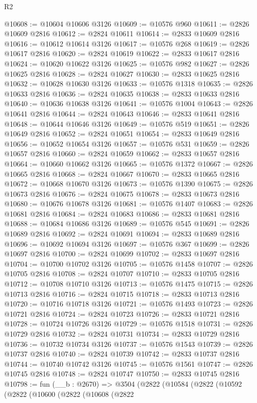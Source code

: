 \begin{lexlean}{R2}
\begin{coremodule}
@10608 := @10604 @10606 @3126
@10609 := @10576 @960
@10611 := @2826 @10609 @2816
@10612 := @2824 @10611
@10614 := @2833 @10609 @2816
@10616 := @10612 @10614 @3126
@10617 := @10576 @268
@10619 := @2826 @10617 @2816
@10620 := @2824 @10619
@10622 := @2833 @10617 @2816
@10624 := @10620 @10622 @3126
@10625 := @10576 @982
@10627 := @2826 @10625 @2816
@10628 := @2824 @10627
@10630 := @2833 @10625 @2816
@10632 := @10628 @10630 @3126
@10633 := @10576 @1318
@10635 := @2826 @10633 @2816
@10636 := @2824 @10635
@10638 := @2833 @10633 @2816
@10640 := @10636 @10638 @3126
@10641 := @10576 @1004
@10643 := @2826 @10641 @2816
@10644 := @2824 @10643
@10646 := @2833 @10641 @2816
@10648 := @10644 @10646 @3126
@10649 := @10576 @519
@10651 := @2826 @10649 @2816
@10652 := @2824 @10651
@10654 := @2833 @10649 @2816
@10656 := @10652 @10654 @3126
@10657 := @10576 @531
@10659 := @2826 @10657 @2816
@10660 := @2824 @10659
@10662 := @2833 @10657 @2816
@10664 := @10660 @10662 @3126
@10665 := @10576 @1372
@10667 := @2826 @10665 @2816
@10668 := @2824 @10667
@10670 := @2833 @10665 @2816
@10672 := @10668 @10670 @3126
@10673 := @10576 @1390
@10675 := @2826 @10673 @2816
@10676 := @2824 @10675
@10678 := @2833 @10673 @2816
@10680 := @10676 @10678 @3126
@10681 := @10576 @1407
@10683 := @2826 @10681 @2816
@10684 := @2824 @10683
@10686 := @2833 @10681 @2816
@10688 := @10684 @10686 @3126
@10689 := @10576 @545
@10691 := @2826 @10689 @2816
@10692 := @2824 @10691
@10694 := @2833 @10689 @2816
@10696 := @10692 @10694 @3126
@10697 := @10576 @367
@10699 := @2826 @10697 @2816
@10700 := @2824 @10699
@10702 := @2833 @10697 @2816
@10704 := @10700 @10702 @3126
@10705 := @10576 @1458
@10707 := @2826 @10705 @2816
@10708 := @2824 @10707
@10710 := @2833 @10705 @2816
@10712 := @10708 @10710 @3126
@10713 := @10576 @1475
@10715 := @2826 @10713 @2816
@10716 := @2824 @10715
@10718 := @2833 @10713 @2816
@10720 := @10716 @10718 @3126
@10721 := @10576 @1493
@10723 := @2826 @10721 @2816
@10724 := @2824 @10723
@10726 := @2833 @10721 @2816
@10728 := @10724 @10726 @3126
@10729 := @10576 @1518
@10731 := @2826 @10729 @2816
@10732 := @2824 @10731
@10734 := @2833 @10729 @2816
@10736 := @10732 @10734 @3126
@10737 := @10576 @1543
@10739 := @2826 @10737 @2816
@10740 := @2824 @10739
@10742 := @2833 @10737 @2816
@10744 := @10740 @10742 @3126
@10745 := @10576 @1561
@10747 := @2826 @10745 @2816
@10748 := @2824 @10747
@10750 := @2833 @10745 @2816
@10798 := fun (__b : @2670) =>
  @3504
    (@2822
      (@10584
        (@2822
          (@10592
            (@2822
              (@10600
                (@2822
                  (@10608
                    (@2822

\end{coremodule}
\end{lexlean}
